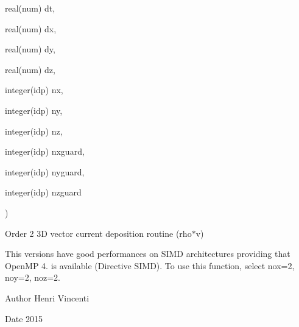 {\begin{DoxyParamCaption}
\item[{real(num)}]{dt, }
\item[{real(num)}]{dx, }
\item[{real(num)}]{dy, }
\item[{real(num)}]{dz, }
\item[{integer(idp)}]{nx, }
\item[{integer(idp)}]{ny, }
\item[{integer(idp)}]{nz, }
\item[{integer(idp)}]{nxguard, }
\item[{integer(idp)}]{nyguard, }
\item[{integer(idp)}]{nzguard}
\end{DoxyParamCaption}
)}\hypertarget{current__deposition_8_f90_a82878814b59bae3273786c1c0e92deb6}{}\label{current__deposition_8_f90_a82878814b59bae3273786c1c0e92deb6}


Order 2 3D vector current deposition routine (rho$\ast$v) 

This versions have good performances on S\+I\+MD architectures providing that Open\+MP 4. is available (Directive S\+I\+MD). To use this function, select nox=2, noy=2, noz=2. \begin{DoxyAuthor}{Author}
Henri Vincenti 
\end{DoxyAuthor}
\begin{DoxyDate}{Date}
2015 
\end{DoxyDate}
